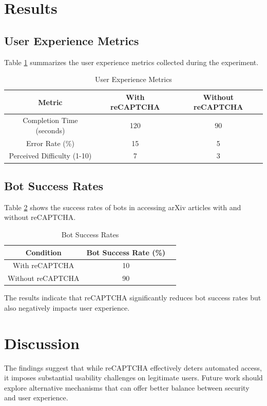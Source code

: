 \documentclass{article}
\begin{document}
\section{Results}
\subsection{User Experience Metrics}
Table \ref{tab:user_experience} summarizes the user experience metrics collected during the experiment.

\begin{table}[h!]
\centering
\begin{tabular}{|c|c|c|}
\hline
Metric & With reCAPTCHA & Without reCAPTCHA \\
\hline
Completion Time (seconds) & 120 & 90 \\
Error Rate (\%) & 15 & 5 \\
Perceived Difficulty (1-10) & 7 & 3 \\
\hline
\end{tabular}
\caption{User Experience Metrics}
\label{tab:user_experience}
\end{table}

\subsection{Bot Success Rates}
Table \ref{tab:bot_success} shows the success rates of bots in accessing arXiv articles with and without reCAPTCHA.

\begin{table}[h!]
\centering
\begin{tabular}{|c|c|c|}
\hline
Condition & Bot Success Rate (\%) \\
\hline
With reCAPTCHA & 10 \\
Without reCAPTCHA & 90 \\
\hline
\end{tabular}
\caption{Bot Success Rates}
\label{tab:bot_success}
\end{table}

The results indicate that reCAPTCHA significantly reduces bot success rates but also negatively impacts user experience.

\section{Discussion}
The findings suggest that while reCAPTCHA effectively deters automated access, it imposes substantial usability challenges on legitimate users. Future work should explore alternative mechanisms that can offer better balance between security and user experience.
\end{document}
